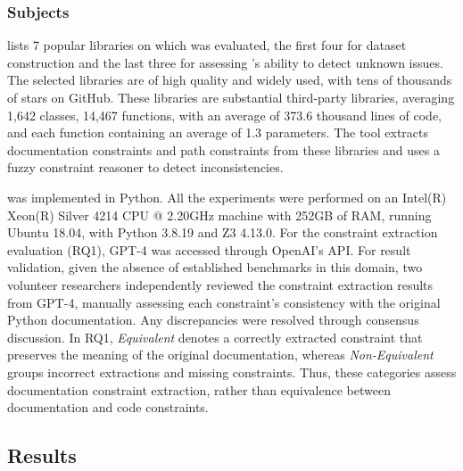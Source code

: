 \subsubsection{Subjects}
 lists 7 popular libraries on which \toolchecker was evaluated, the first four for dataset construction and the last three for assessing \toolchecker's ability to detect unknown issues. The selected libraries are of high quality and widely used, with tens of thousands of stars on GitHub. These libraries are substantial third-party libraries, averaging 1,642 classes, 14,467 functions, with an average of 373.6 thousand lines of code, and each function containing an average of 1.3 parameters. The tool extracts documentation constraints and path constraints from these libraries and uses a fuzzy constraint reasoner to detect inconsistencies.

\toolchecker was implemented in Python. All the experiments were performed on an Intel(R) Xeon(R) Silver 4214 CPU @ 2.20GHz machine with 252GB of RAM, running Ubuntu 18.04, with Python 3.8.19 and Z3 4.13.0.
For the constraint extraction evaluation (RQ1), GPT-4 was accessed through OpenAI's API. For result validation, given the absence of established benchmarks in this domain, two volunteer researchers independently reviewed the constraint extraction results from GPT-4, manually assessing each constraint's consistency with the original Python documentation. Any discrepancies were resolved through consensus discussion. In RQ1, \textit{Equivalent} denotes a correctly extracted constraint that preserves the meaning of the original documentation, whereas \textit{Non-Equivalent} groups incorrect extractions and missing constraints. Thus, these categories assess documentation constraint extraction, rather than equivalence between documentation and code constraints.


\subsection{Results}
